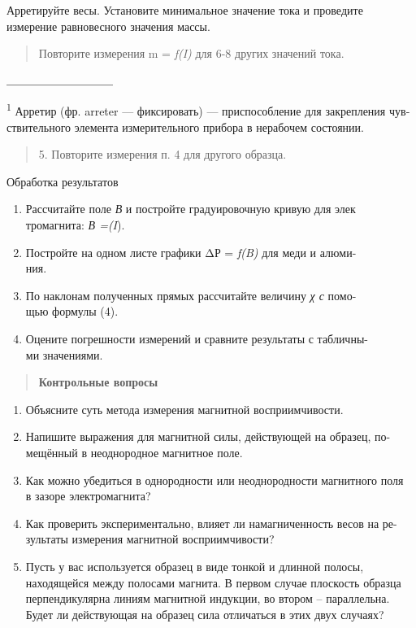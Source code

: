 \documentclass[]{article}
\begin{document}
Арретируйте весы. Установите минимальное значение тока и прове­дите
измерение равновесного значения массы.

\begin{quote}
Повторите измерения m = \emph{f(I)} для 6-8 других значений тока.
\end{quote}

\includegraphics{./media/image16.jpeg}

\textsuperscript{1} Арретир (фр. arreter --- фиксировать) ---
приспособление для закрепления чув­ствительного элемента измерительного
прибора в нерабочем состоянии.

\begin{quote}
5. Повторите измерения п. 4 для другого образца.
\end{quote}

Обработка результатов

\begin{enumerate}
\def\labelenumi{\arabic{enumi}.}
\item
  Рассчитайте поле \emph{В} и постройте градуировочную кривую для
  элек­\\
  тромагнита: \emph{В =(I}).
\item
  Постройте на одном листе графики \textbar{}ΔР\textbar{} = \emph{f(B)}
  для меди и алюми­-\\
  ния.
\item
  По наклонам полученных прямых рассчитайте величину \emph{χ с} помо-­\\
  щью формулы (4).
\item
  Оцените погрешности измерений и сравните результаты с табличны-­\\
  ми значениями.
\end{enumerate}

\begin{quote}
\textbf{Контрольные вопросы}
\end{quote}

\begin{enumerate}
\def\labelenumi{\arabic{enumi}.}
\item
  Объясните суть метода измерения магнитной восприимчивости.
\item
  Напишите выражения для магнитной силы, действующей на образец, по-­\\
  мещённый в неоднородное магнитное поле.
\item
  Как можно убедиться в однородности или неоднородности магнитного
  поля\\
  в зазоре электромагнита?
\item
  Как проверить экспериментально, влияет ли намагниченность весов на
  ре­-\\
  зультаты измерения магнитной восприимчивости?
\item
  Пусть у вас используется образец в виде тонкой и длинной полосы,
  находящейся между полосами магнита. В первом случае плоскость образца
  перпендикулярна линиям магнитной индукции, во втором -- параллельна.
  Будет ли действующая на образец сила отличаться в этих двух случаях?
\end{enumerate}
\end{document}
